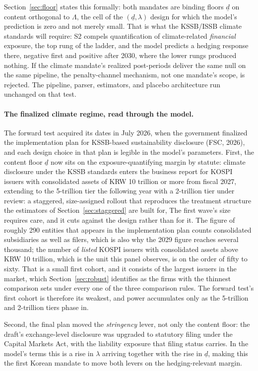 \documentclass[11pt,a4paper]{article}
\begin{document}
Section~\ref{sec:floor} states this formally: both mandates are binding floors $\underline{d}$ on content orthogonal to $\Lambda$, the cell of the $(\underline{d},\lambda)$ design for which the model's prediction is zero and not merely small. That is what the KSSB/ISSB climate standards will require: S2 compels quantification of climate-related \emph{financial} exposure, the top rung of the ladder, and the model predicts a hedging response there, negative first and positive after 2030, where the lower rungs produced nothing. If the climate mandate's realized post-periods deliver the same null on the same pipeline, the penalty-channel mechanism, not one mandate's scope, is rejected. The pipeline, parser, estimators, and placebo architecture run unchanged on that test.

\paragraph{The finalized climate regime, read through the model.}
The forward test acquired its dates in July 2026, when the government finalized the implementation plan for KSSB-based sustainability disclosure (FSC, 2026), and each design choice in that plan is legible in the model's parameters. First, the content floor $\underline{d}$ now sits on the exposure-quantifying margin by statute: climate disclosure under the KSSB standards enters the business report for KOSPI issuers with consolidated assets of KRW 10 trillion or more from fiscal 2027, extending to the 5-trillion tier the following year with a 2-trillion tier under review: a staggered, size-assigned rollout that reproduces the treatment structure the estimators of Section~\ref{sec:staggered} are built for, The first wave's size requires care, and it cuts against the design rather than for it. The figure of roughly 290 entities that appears in the implementation plan counts consolidated subsidiaries as well as filers, which is also why the 2029 figure reaches several thousand; the number of \emph{listed} KOSPI issuers with consolidated assets above KRW 10 trillion, which is the unit this panel observes, is on the order of fifty to sixty. That is a small first cohort, and it consists of the largest issuers in the market, which Section~\ref{sec:robust} identifies as the firms with the thinnest comparison sets under every one of the three comparison rules. The forward test's first cohort is therefore its weakest, and power accumulates only as the 5-trillion and 2-trillion tiers phase in.

Second, the final plan moved the \emph{stringency} lever, not only the content floor: the draft's exchange-level disclosure was upgraded to statutory filing under the Capital Markets Act, with the liability exposure that filing status carries. In the model's terms this is a rise in $\lambda$ arriving together with the rise in $\underline{d}$, making this the first Korean mandate to move both levers on the hedging-relevant margin.
\end{document}

